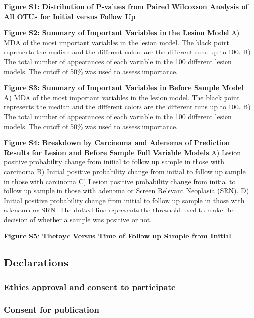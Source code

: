 \documentclass[12pt,]{article}
\begin{document}
\newpage

\textbf{Figure S1: Distribution of P-values from Paired Wilcoxson
Analysis of All OTUs for Initial versus Follow Up}

\textbf{Figure S2: Summary of Important Variables in the Lesion Model}
A) MDA of the most important variables in the lesion model. The black
point represents the median and the different colors are the different
runs up to 100. B) The total number of appearances of each variable in
the 100 different lesion models. The cutoff of 50\% was used to assess
importance.

\textbf{Figure S3: Summary of Important Variables in Before Sample
Model} A) MDA of the most important variables in the lesion model. The
black point represents the median and the different colors are the
different runs up to 100. B) The total number of appearances of each
variable in the 100 different lesion models. The cutoff of 50\% was used
to assess importance.

\textbf{Figure S4: Breakdown by Carcinoma and Adenoma of Prediction
Results for Lesion and Before Sample Full Variable Models} A) Lesion
positive probability change from initial to follow up sample in those
with carcinoma B) Initial positive probability change from initial to
follow up sample in those with carcinoma C) Lesion positive probability
change from initial to follow up sample in those with adenoma or Screen
Relevant Neoplasia (SRN). D) Initial positive probability change from
initial to follow up sample in those with adenoma or SRN. The dotted
line represents the threshold used to make the decision of whether a
sample was positive or not.

\textbf{Figure S5: Thetayc Versus Time of Follow up Sample from Initial}

\newpage

\subsection{Declarations}\label{declarations}

\subsubsection{Ethics approval and consent to
participate}\label{ethics-approval-and-consent-to-participate}

\subsubsection{Consent for publication}\label{consent-for-publication}
\end{document}
